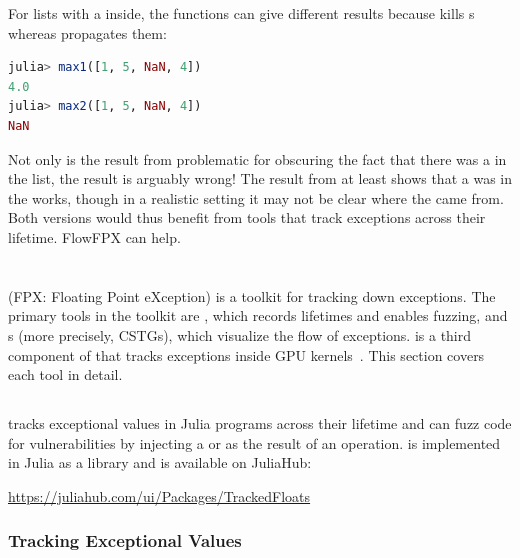 \documentclass{juliacon}
\begin{document}
For lists with a \Nan{} inside, the functions can give different
results because \code{<=} kills \Nan{}s whereas 
propagates them:

\begin{lstlisting}[language = Julia]
julia> max1([1, 5, NaN, 4]) 
4.0
julia> max2([1, 5, NaN, 4]) 
NaN
\end{lstlisting}

Not only is the result from  problematic for obscuring the fact that there was a \NaN{} in the list, the result is arguably wrong!
The result from  at least shows that a \Nan{} was in the works, though in a realistic setting it may not be clear where the \Nan{} came from.
Both versions would thus benefit from tools that track exceptions across their lifetime.
FlowFPX can help.

\section{\FlowFPX{}}
\label{s:flowfpx}

\FlowFPX{} (FPX: Floating Point eXception) is a toolkit for tracking down \fp{} exceptions.
The primary tools in the \FlowFPX{} toolkit are \TF{}, which records lifetimes
and enables fuzzing, and \CSTG{}s (more precisely, CSTGs), which visualize
the flow of exceptions.
\GPUFPX{} is a third component of \FlowFPX{} that tracks \fp{} exceptions inside GPU kernels~\cite{llsflg-hpdc-2023}.
This section covers each tool in detail.

\subsection{\TF{}}
\label{s:floattracker}

\TF{} tracks exceptional values in Julia programs across
their \genpropkill{} lifetime and can fuzz code for vulnerabilities by
injecting a \Nan{} or \Inf{} as the result of an operation. \TF{} is
implemented in Julia as a library and is available on JuliaHub:

\noindent\begin{center}\noindent\!\!\url{https://juliahub.com/ui/Packages/TrackedFloats}\!\!
\end{center}

\subsubsection{Tracking Exceptional Values}
\label{s:trackingexceptionalvalues}
\end{document}

